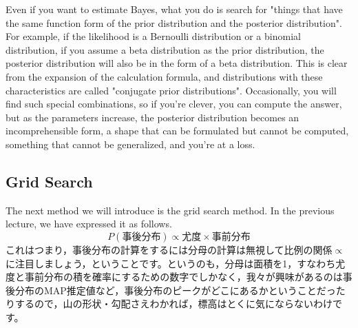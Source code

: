 \documentclass{ltjbook}
\begin{document}
Even if you want to estimate Bayes, what you do is search for "things that have the same function form of the prior distribution and the posterior distribution". For example, if the likelihood is a Bernoulli distribution or a binomial distribution, if you assume a beta distribution as the prior distribution, the posterior distribution will also be in the form of a beta distribution. This is clear from the expansion of the calculation formula, and distributions with these characteristics are called "conjugate prior distributions". Occasionally, you will find such special combinations, so if you're clever, you can compute the answer, but as the parameters increase, the posterior distribution becomes an incomprehensible form, a shape that can be formulated but cannot be computed, something that cannot be generalized, and you're at a loss.
\subsection{Grid Search}
The next method we will introduce is the grid search method. In the previous lecture, we have expressed it as follows.
\[ P(\mbox{事後分布}) \propto \mbox{尤度}\times \mbox{事前分布}\]
これはつまり，事後分布の計算をするには分母の計算は無視して比例の関係$\propto$に注目しましょう，ということです。というのも，分母は面積を1，すなわち尤度と事前分布の積を確率にするための数字でしかなく，我々が興味があるのは事後分布のMAP推定値など，事後分布のピークがどこにあるかということだったりするので，山の形状・勾配さえわかれば，標高はとくに気にならないわけです。
\end{document}
